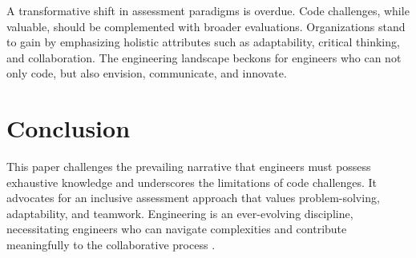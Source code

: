 \documentclass[
    a4paper, %
    10pt, %
    unnumberedsections, %
    twoside, %
]{LTJournalArticle}
\begin{document}
A transformative shift in assessment paradigms is overdue. Code challenges, while valuable, should be complemented with broader evaluations. Organizations stand to gain by emphasizing holistic attributes such as adaptability, critical thinking, and collaboration. The engineering landscape beckons for engineers who can not only code, but also envision, communicate, and innovate.


\section{Conclusion}

This paper challenges the prevailing narrative that engineers must possess exhaustive knowledge and underscores the limitations of code challenges. It advocates for an inclusive assessment approach that values problem-solving, adaptability, and teamwork. Engineering is an ever-evolving discipline, necessitating engineers who can navigate complexities and contribute meaningfully to the collaborative process \cite{Smith2020,Johnson2019,Brown2021,Garcia2022}.


\printbibliography %

\end{document}

